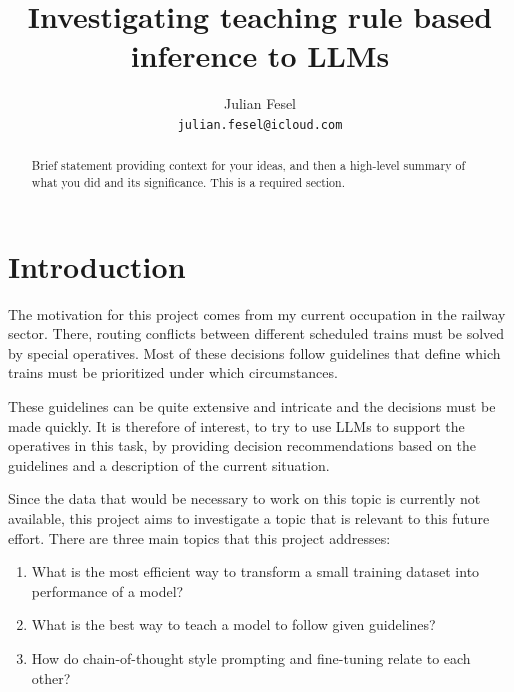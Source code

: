 \documentclass[11pt]{article}
\title{Investigating teaching rule based inference to LLMs}
\author{Julian Fesel \\
\texttt{julian.fesel@icloud.com}
}
\begin{document}
    \maketitle
    \begin{abstract}
        Brief statement providing context for your ideas, and then a high-level summary of what you did and its significance. This is a required section.
    \end{abstract}


    \section{Introduction}

    The motivation for this project comes from my current occupation in the railway sector.
    There, routing conflicts between different scheduled trains must be solved by special operatives.
    Most of these decisions follow guidelines that define which trains must be prioritized under which circumstances.

    These guidelines can be quite extensive and intricate and the decisions must be made quickly.
    It is therefore of interest, to try to use LLMs to support the operatives in this task, by providing decision
    recommendations based on the guidelines and a description of the current situation.

    Since the data that would be necessary to work on this topic is currently not available, this project aims to
    investigate a topic that is relevant to this future effort.
    There are three main topics that this project addresses:
    \begin{enumerate}
        \item What is the most efficient way to transform a small training dataset into performance of a model?
        \item What is the best way to teach a model to follow given guidelines?
        \item How do chain-of-thought style prompting and fine-tuning relate to each other?
    \end{enumerate}
\end{document}
